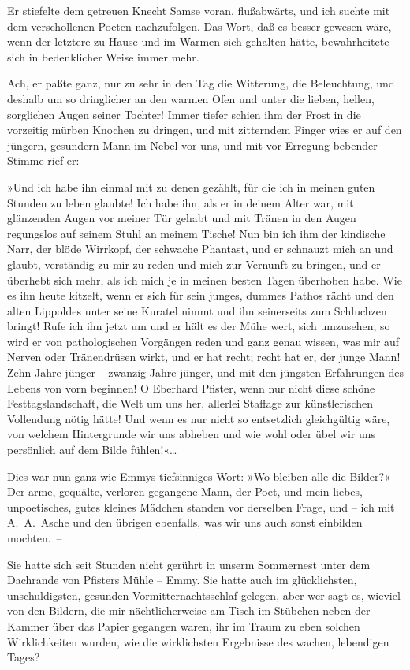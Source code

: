 Er stiefelte dem getreuen Knecht Samse voran, flußabwärts, und ich
suchte mit dem verschollenen Poeten nachzufolgen. Das Wort, daß es
besser gewesen wäre, wenn der letztere zu Hause und im Warmen sich
gehalten hätte, bewahrheitete sich in bedenklicher Weise immer
mehr.

Ach, er paßte ganz, nur zu sehr in den Tag die Witterung, die
Beleuchtung, und deshalb um so dringlicher an den warmen Ofen und
unter die lieben, hellen, sorglichen Augen seiner Tochter! Immer
tiefer schien ihm der Frost in die vorzeitig mürben Knochen zu
dringen, und mit zitterndem Finger wies er auf den jüngern,
gesundern Mann im Nebel vor uns, und mit vor Erregung bebender
Stimme rief er:

»Und ich habe ihn einmal mit zu denen gezählt, für die ich in
meinen guten Stunden zu leben glaubte! Ich habe ihn, als er in
deinem Alter war, mit glänzenden Augen vor meiner Tür gehabt und
mit Tränen in den Augen regungslos auf seinem Stuhl an meinem
Tische! Nun bin ich ihm der kindische Narr, der blöde Wirrkopf, der
schwache Phantast, und er schnauzt mich an und glaubt, verständig
zu mir zu reden und mich zur Vernunft zu bringen, und er überhebt
sich mehr, als ich mich je in meinen besten Tagen überhoben habe.
Wie es ihn heute kitzelt, wenn er sich für sein junges, dummes
Pathos rächt und den alten Lippoldes unter seine Kuratel nimmt und
ihn seinerseits zum Schluchzen bringt! Rufe ich ihn jetzt um und er
hält es der Mühe wert, sich umzusehen, so wird er von
pathologischen Vorgängen reden und ganz genau wissen, was mir auf
Nerven oder Tränendrüsen wirkt, und er hat recht; recht hat er, der
junge Mann! Zehn Jahre jünger – zwanzig Jahre jünger, und mit den
jüngsten Erfahrungen des Lebens von vorn beginnen! O Eberhard
Pfister, wenn nur nicht diese schöne Festtagslandschaft, die Welt
um uns her, allerlei Staffage zur künstlerischen Vollendung nötig
hätte! Und wenn es nur nicht so entsetzlich gleichgültig wäre, von
welchem Hintergrunde wir uns abheben und wie wohl oder übel wir uns
persönlich auf dem Bilde fühlen!«\ldots{}

Dies war nun ganz wie Emmys tiefsinniges Wort: »Wo bleiben alle die
Bilder?« – Der arme, gequälte, verloren gegangene Mann, der Poet,
und mein liebes, unpoetisches, gutes kleines Mädchen standen vor
derselben Frage, und – ich mit A.~A.~Asche und den übrigen
ebenfalls, was wir uns auch sonst einbilden mochten.~–

Sie hatte sich seit Stunden nicht gerührt in unserm Sommernest
unter dem Dachrande von Pfisters Mühle – Emmy. Sie hatte auch im
glücklichsten, unschuldigsten, gesunden Vormitternachtsschlaf
gelegen, aber wer sagt es, wieviel von den Bildern, die mir
nächtlicherweise am Tisch im Stübchen neben der Kammer über das
Papier gegangen waren, ihr im Traum zu eben solchen Wirklichkeiten
wurden, wie die wirklichsten Ergebnisse des wachen, lebendigen
Tages?

